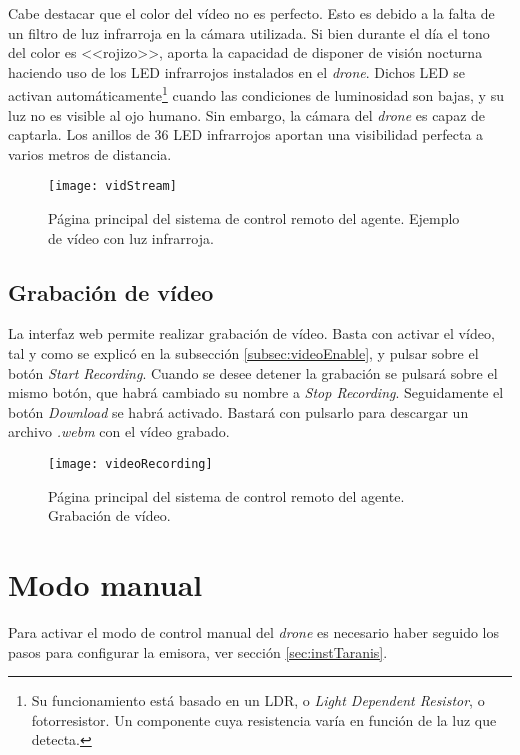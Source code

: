Cabe destacar que el color del vídeo no es perfecto. Esto es debido a la falta de un filtro de luz infrarroja en la cámara utilizada. Si bien durante el día el tono del color es <<rojizo>>, aporta la capacidad de disponer de visión nocturna haciendo uso de los LED infrarrojos instalados en el \emph{drone}. Dichos LED se activan automáticamente\footnote{Su funcionamiento está basado en un LDR, o \emph{Light Dependent Resistor}, o fotorresistor. Un componente cuya resistencia varía en función de la luz que detecta.} cuando las condiciones de luminosidad son bajas, y su luz no es visible al ojo humano. Sin embargo, la cámara del \emph{drone} es capaz de captarla. Los anillos de 36 LED infrarrojos aportan una visibilidad perfecta a varios metros de distancia. 

\begin{figure}[H]
	\centering
	\texttt{[image: vidStream]}
	\caption[Página principal. Gestión de vídeo. Nocturno.]{Página principal del sistema de control remoto del agente. Ejemplo de vídeo con luz infrarroja.}\label{fig:samplevidenight}
\end{figure}


\subsection{Grabación de vídeo}
La interfaz web permite realizar grabación de vídeo. Basta con activar el vídeo, tal y como se explicó en la subsección \ref{subsec:videoEnable}, y pulsar sobre el botón \emph{Start Recording}. Cuando se desee detener la grabación se pulsará sobre el mismo botón, que habrá cambiado su nombre a \emph{Stop Recording}. Seguidamente el botón \emph{Download} se habrá activado. Bastará con pulsarlo para descargar un archivo \emph{.webm} con el vídeo grabado.

\begin{figure}[H]
	\centering
	\texttt{[image: videoRecording]}
	\caption[Página principal. Gestión de vídeo. Grabación.]{Página principal del sistema de control remoto del agente. Grabación de vídeo.}\label{fig:userManualRecordVideo}
\end{figure}

\section{Modo manual}

Para activar el modo de control manual del \emph{drone} es necesario haber seguido los pasos para configurar la emisora, ver sección \ref{sec:instTaranis}. 

